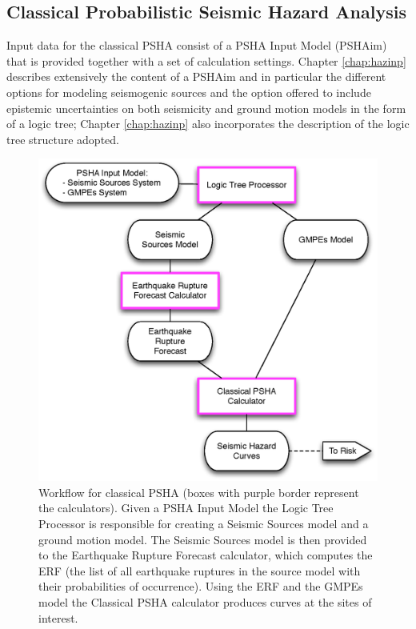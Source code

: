 \subsection{Classical Probabilistic Seismic Hazard Analysis}
\label{section:classicalPSHA}
%
Input data for the classical PSHA consist of a PSHA Input Model (PSHAim) that 
is provided together with a set of calculation settings. 
%
Chapter \ref{chap:hazinp} describes extensively the content of a PSHAim and 
in particular the different options for modeling seismogenic sources and the 
option offered to include epistemic uncertainties on both seismicity and 
ground motion models in the form of a logic tree; Chapter \ref{chap:hazinp} 
also incorporates the description of the logic tree structure adopted.
%
\begin{figure}[htbp]
\begin{center}
\includegraphics[width=12cm]{./Figures/Part_Hazard/classical_psha_workflow.eps}
\caption{Workflow for classical PSHA (boxes with purple border represent the 
calculators). Given a PSHA Input Model 
the Logic Tree Processor is responsible for creating a Seismic Sources model
and a ground motion model. 
The Seismic Sources model is then provided to the Earthquake Rupture Forecast 
calculator, which computes the ERF (the list of all earthquake ruptures in the 
source model with their probabilities of occurrence). 
Using the ERF and the GMPEs model the Classical PSHA calculator produces 
curves at the sites of interest.}
\label{classical_psha_workflow}
\end{center}
\end{figure}

